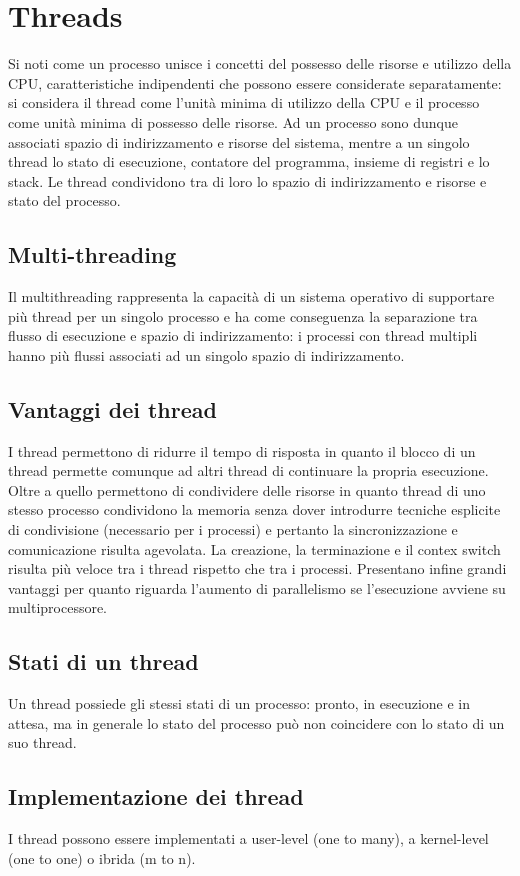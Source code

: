 \section{Threads}
Si noti come un processo unisce i concetti del possesso delle risorse e utilizzo della CPU, caratteristiche indipendenti che possono essere considerate separatamente: si considera il 
thread come l'unit\`a minima di utilizzo della CPU e il processo come unit\`a minima di possesso delle risorse. Ad un processo sono dunque associati spazio di indirizzamento e risorse
del sistema, mentre a un singolo thread lo stato di esecuzione, contatore del programma, insieme di registri e lo stack. Le thread condividono tra di loro lo spazio di indirizzamento e
risorse e stato del processo.
\subsection{Multi-threading}
Il multithreading rappresenta la capacit\`a di un sistema operativo di supportare pi\`u thread per un singolo processo e ha come conseguenza la separazione tra flusso di esecuzione e 
spazio di indirizzamento: i processi con thread multipli hanno pi\`u flussi associati ad un singolo spazio di indirizzamento. 
\subsection{Vantaggi dei thread}
I thread permettono di ridurre il tempo di risposta in quanto il blocco di un thread permette comunque ad altri thread di continuare la propria esecuzione. Oltre a quello permettono
di condividere delle risorse in quanto thread di uno stesso processo condividono la memoria senza dover introdurre tecniche esplicite di condivisione (necessario per i processi) e 
pertanto la sincronizzazione e comunicazione risulta agevolata. La creazione, la terminazione e il contex switch risulta pi\`u veloce tra i thread rispetto che tra i processi. 
Presentano infine grandi vantaggi per quanto riguarda l'aumento di parallelismo se l'esecuzione avviene su multiprocessore. 
\subsection{Stati di un thread}
Un thread possiede gli stessi stati di un processo: pronto, in esecuzione e in attesa, ma in generale lo stato del processo pu\`o non coincidere con lo stato di un suo thread.
\subsection{Implementazione dei thread}
I thread possono essere implementati a user-level (one to many), a kernel-level (one to one) o ibrida (m to n).

